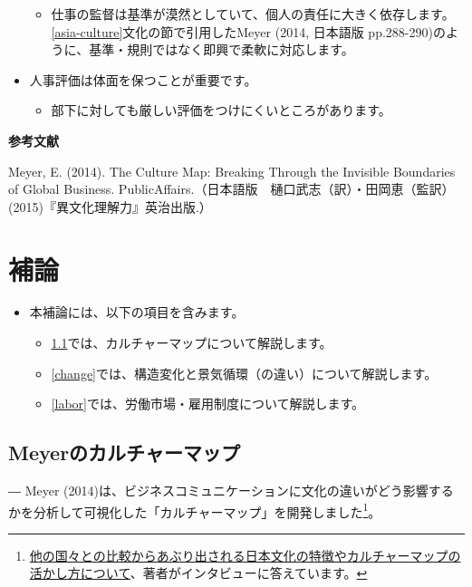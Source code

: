 \documentclass[
]{book}
\providecommand{\tightlist}{%
  \setlength{\itemsep}{0pt}\setlength{\parskip}{0pt}}
\begin{document}
\begin{itemize}
  \begin{itemize}
  \tightlist
  \item
    仕事の監督は基準が漠然としていて、個人の責任に大きく依存します。\ref{asia-culture}文化の節で引用したMeyer (2014, 日本語版 pp.288-290)のように、基準・規則ではなく即興で柔軟に対応します。
  \end{itemize}
\item
  人事評価は体面を保つことが重要です。

  \begin{itemize}
  \tightlist
  \item
    部下に対しても厳しい評価をつけにくいところがあります。
  \end{itemize}
\end{itemize}

{\textbf{参考文献}}

Meyer, E. (2014). The Culture Map: Breaking Through the Invisible Boundaries of Global Business. PublicAffairs.（日本語版　樋口武志（訳）・田岡恵（監訳）(2015)『異文化理解力』英治出版.）

\hypertarget{appendix}{%
\chapter{補論}\label{appendix}}

\begin{itemize}
\item
  本補論には、以下の項目を含みます。

  \begin{itemize}
  \item
    \ref{meyer}では、カルチャーマップについて解説します。
  \item
    \ref{change}では、構造変化と景気循環（の違い）について解説します。
  \item
    \ref{labor}では、労働市場・雇用制度について解説します。
  \end{itemize}
\end{itemize}

\hypertarget{meyer}{%
\section{Meyerのカルチャーマップ}\label{meyer}}

― Meyer (2014)は、ビジネスコミュニケーションに文化の違いがどう影響するかを分析して可視化した「カルチャーマップ」を開発しました\footnote{\href{https://plus.alc.co.jp/2018/01/meyer/}{他の国々との比較からあぶり出される日本文化の特徴やカルチャーマップの活かし方について}、著者がインタビューに答えています。}。
\end{document}
